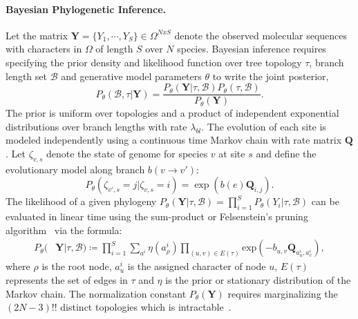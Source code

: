 \documentclass[accepted]{uai2021} %
\theoremstyle{definition}
\begin{document}
\paragraph{Bayesian Phylogenetic Inference.}
Let the matrix $\mathbf{Y} = \{Y_1,\cdots,Y_S \} \in \Omega^{NxS}$ denote the observed molecular sequences with characters in $\Omega$ of length $S$ over $N$ species. Bayesian inference requires specifying the prior density and likelihood function over tree topology $\tau$, branch length set $\mathcal{B}$ and generative model parameters $\theta$ to write the joint posterior,
\begin{equation}
    P_{\theta}(\mathcal{B},\tau|\mathbf{Y}) = \frac{P_{\theta}(\mathbf{Y}|\tau,\mathcal{B})P_{\theta}(\tau,\mathcal{B})}{P_{\theta}(\mathbf{Y})}.
    \label{eq:posterior}
\end{equation}
The prior is uniform over topologies and a product of independent exponential distributions over branch lengths with rate $\lambda_{bl}$. The evolution of each site is modeled independently using a continuous time Markov chain with rate matrix $\mathbf{Q}$.
Let $\zeta_{v,s}$ denote the state of genome for species $v$ at site $s$ and define the evolutionary model along branch $b(v\rightarrow v')$:
\begin{equation} 
P_{\theta}(\zeta_{v',s} = j| \zeta_{v,s} = i) = \exp\left(b(e)\mathbf{Q}_{i,j}\right).
\end{equation}
The likelihood of a given phylogeny $P_{\theta}(\mathbf{Y}|\tau,\mathcal{B}) = \prod\limits_{i=1}^{S}P_{\theta}(Y_i|\tau,\mathcal{B})$ can be evaluated in linear time using the sum-product or Felsenstein's pruning algorithm~\citep{Felsenstein:1981:J-Mol-Evol:7288891} via the formula:
\begin{align*}
    P_{\theta}(&\mathbf{Y}|\tau,\mathcal{B}) %
    \coloneqq \prod\limits_{i=1}^{S}\sum\limits_{a^i}^{}\eta(a^i_{\rho})\prod\limits_{(u,v)\in E(\tau)}^{}\text{exp}\left(-b_{u,v}\mathbf{Q}_{a_u^i,a_v^i} \right),
\end{align*}
where $\rho$ is the root node, $a^i_u$ is the assigned character of node $u$, $E(\tau)$ represents the set of edges in $\tau$ and $\eta$ is the prior or stationary distribution of the Markov chain. The normalization constant $P_{\theta}(\mathbf{Y})$ requires marginalizing the $(2N-3)!!$ distinct topologies which is intractable~\citep{semple2003phylogenetics}. 
\end{document}
